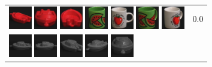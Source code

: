 \begin{figure}[!bp]
\begin{tabular}{m{11cm} | m{3cm} |}
\includegraphics[width=1cm]{coil/beeld-22.eps}
\includegraphics[width=1cm]{coil/beeld-20.eps}
\includegraphics[width=1cm]{coil/beeld-23.eps}
\includegraphics[width=1cm]{coil/beeld-32.eps}
\includegraphics[width=1cm]{coil/beeld-36.eps}
\includegraphics[width=1cm]{coil/beeld-33.eps}
\includegraphics[width=1cm]{coil/beeld-39.eps}
& {\scriptsize 0.0}
\\
\includegraphics[width=1cm]{coil/beeld-24.eps}
\includegraphics[width=1cm]{coil/beeld-25.eps}
\includegraphics[width=1cm]{coil/beeld-28.eps}
\includegraphics[width=1cm]{coil/beeld-27.eps}
\includegraphics[width=1cm]{coil/beeld-26.eps}

\end{tabular}
\end{figure}
